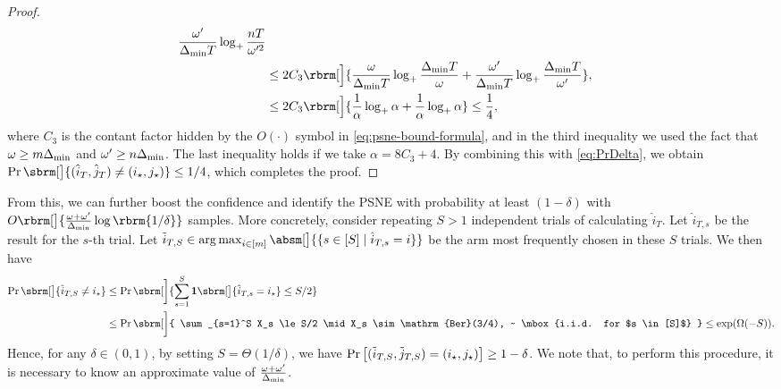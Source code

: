 \begin{proof}
\begin{align*}
{            { 
                \frac{\omegac}{\Delta_{\min}T}
                \log_+ \frac{ nT }{ \omegac^2 }
            }
        } \\
        &
        \leq 2C_3
        \rbrm[\Big]{
            {
                \frac{\omegar}{\Delta_{\min}T}
                \log_+ \frac{ \Delta_{\min}T }{ \omegar }
            }
            +
            { 
                \frac{\omegac}{\Delta_{\min}T}
                \log_+ \frac{ \Delta_{\min}T }{ \omegac }
            }
        },\\
        &
        \leq 2C_3
        \rbrm[\Big]{
            {
                \frac{1}{\alpha}
                \log_+ \alpha
            }
            +
            { 
                \frac{1}{\alpha}
                \log_+ \alpha
            }
        } \leq \frac{1}{4},
    \end{align*}
    where $C_3$ is the contant factor hidden by the $O(\cdot)$ symbol in \eqref{eq:psne-bound-formula},
    and in the third inequality we used the fact that $\omega \ge m \Delta_{\min}$ and $\omega' \ge n \Delta_{\min}$.
    The last inequality holds if we take $\alpha=8C_3+4$.
    By combining this with \eqref{eq:PrDelta},
    we obtain
    $\Pr \sbrm[\big]{ (\hat{i}_T, \hat{j}_T)  \neq ( \istar, \jstar) } \le 1/4$,
    which completes the proof.
\end{proof}
From this,
we can further boost the confidence and identify the PSNE with probability at least $(1-\delta)$ with 
$O\rbrm[\big]{\frac{\omegar + \omegac}{\Delta_{\min}} \log \rbrm{ 1/\delta } }$ samples.
More concretely,
consider repeating $S > 1$ independent trials of calculating $\hat{i}_T$.
Let $\hat{i}_{T, s}$ be the result for the $s$-th trial.
Let $\tilde{i}_{T,S} \in \argmax_{i \in [m]} \absm[\big]{\{ s \in [S] \mid \hat{i}_{T, s} = i \} }$
be the arm most frequently chosen in these $S$ trials.
We then have
\begin{align*}
    \Pr \sbrm[\big]{
    \tilde{i}_{T,S}
    \neq 
    i_{\star}
    }
    &
    \le
    \Pr \sbrm[\bigg]{
    \sum_{s=1}^S
    \mathbf{1}\sbrm[\big]{
    \hat{i}_{T, s}
    =
    i_{\star}
    }
    \le
    S/2
    }
    \\
    &
    \le
    \Pr\sbrm[\bigg]{
    \sum_{s=1}^S
    X_s
    \le
    S/2
    \mid
    X_s \sim \mathrm{Ber}(3/4),
    ~
    \mbox{i.i.d. for $s \in [S]$}
    }
    \le \exp \rbr{ \Omega( - S ) }.
\end{align*}
Hence,
for any $\delta \in (0, 1)$,
by setting $S = \Theta ( 1 / \delta )$,
we have 
$
\Pr \left[
(\tilde{i}_{T,S}, \tilde{j}_{T,S})
=
(i_{\star}, j_{\star})
\right]
\ge 1 - \delta
$.
We note that,
to perform this procedure, it is necessary to know an approximate value of $\frac{\omega + \omega'}{\Delta_{\min}}$.


